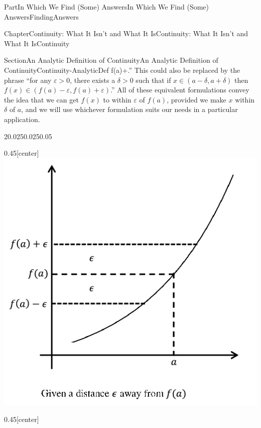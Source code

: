 \documentclass[oneside,10pt,]{book}
\numberwithin{equation}{part}
\newcommand{\eps}{\varepsilon}
\begin{document}
\begin{partptx}{Part}{In Which We Find (Some) Answers}{}{In Which We Find (Some) Answers}{}{}{FindingAnswers}
\begin{chapterptx}{Chapter}{Continuity: What It Isn't and What It Is}{}{Continuity: What It Isn't and What It Is}{}{}{Continuity}
\begin{sectionptx}{Section}{An Analytic Definition of Continuity}{}{An Analytic Definition of Continuity}{}{}{Continuity-AnalyticDef}
f(a)+\eps\).'' This could also be replaced by the phrase ``for any \(\eps>0\), there exists a \(\delta>0\) such that if \(x\in(a-\delta,a+\delta)\) then \(f(x)\in(f(a)-\eps,f(a)+\eps)\).'' All of these equivalent formulations convey the idea that we can get \(f(x)\) to within \(\eps\) of \(f(a)\), provided we make \(x\) within \(\delta\) of \(a\), and we will use whichever formulation suits our needs in a particular application.%
\begin{sidebyside}{2}{0.025}{0.025}{0.05}%
\begin{sbspanel}{0.45}[center]%
\noindent\includegraphics[width=\linewidth]{external/images/Ch5fig3a.png}
\end{sbspanel}%
\begin{sbspanel}{0.45}[center]%

\end{sbspanel}
\end{sidebyside}
\end{sectionptx}
\end{chapterptx}
\end{partptx}
\end{document}
